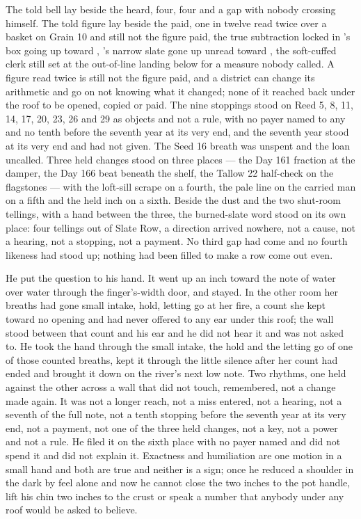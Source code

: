 The told bell lay beside the heard, four, four and a gap with nobody crossing himself. The told figure lay beside the paid, one in twelve read twice over a basket on Grain 10 and still not the figure paid, the true subtraction locked in 's box going up toward , 's narrow slate gone up unread toward , the soft-cuffed clerk still set at the out-of-line landing below  for a measure nobody called. A figure read twice is still not the figure paid, and a district can change its arithmetic and go on not knowing what it changed; none of it reached back under the roof to be opened, copied or paid. The nine stoppings stood on Reed 5, 8, 11, 14, 17, 20, 23, 26 and 29 as objects and not a rule, with no payer named to any and no tenth before the seventh year at its very end, and the seventh year stood at its very end and had not given. The Seed 16 breath was unspent and the loan uncalled. Three held changes stood on three places --- the Day 161 fraction at the damper, the Day 166 beat beneath the shelf, the Tallow 22 half-check on the flagstones --- with the loft-sill scrape on a fourth, the pale line on the carried man on a fifth and the held inch on a sixth. Beside the dust and the two shut-room tellings, with a hand between the three, the burned-slate word stood on its own place: four tellings out of Slate Row, a direction arrived nowhere, not a cause, not a hearing, not a stopping, not a payment. No third gap had come and no fourth likeness had stood up; nothing had been filled to make a row come out even.

He put the question to his hand. It went up an inch toward the note of water over water through the finger's-width door, and stayed. In the other room her breaths had gone small intake, hold, letting go at her fire, a count she kept toward no opening and had never offered to any ear under this roof; the wall stood between that count and his ear and he did not hear it and was not asked to. He took the hand through the small intake, the hold and the letting go of one of those counted breaths, kept it through the little silence after her count had ended and brought it down on the river's next low note. Two rhythms, one held against the other across a wall that did not touch, remembered, not a change made again. It was not a longer reach, not a miss entered, not a hearing, not a seventh of the full note, not a tenth stopping before the seventh year at its very end, not a payment, not one of the three held changes, not a key, not a power and not a rule. He filed it on the sixth place with no payer named and did not spend it and did not explain it. Exactness and humiliation are one motion in a small hand and both are true and neither is a sign; once he reduced a shoulder in the dark by feel alone and now he cannot close the two inches to the pot handle, lift his chin two inches to the crust or speak a number that anybody under any roof would be asked to believe.

